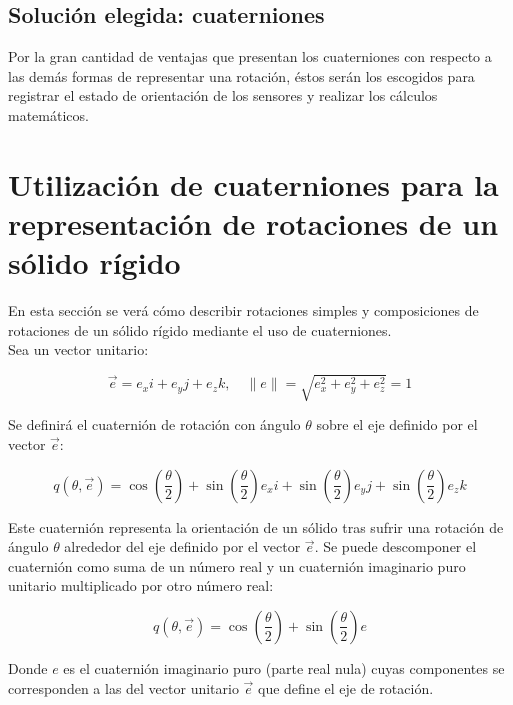 \documentclass[12pt, a4paper]{report}
\begin{document}
\subsection{Solución elegida: cuaterniones}

Por la gran cantidad de ventajas que presentan los cuaterniones con respecto a las demás formas de representar una rotación, éstos serán los escogidos para registrar el estado de orientación de los sensores y realizar los cálculos matemáticos.

\section{Utilización de cuaterniones para la representación de rotaciones de un sólido rígido}

En esta sección se verá cómo describir rotaciones simples y composiciones de rotaciones de un sólido rígido mediante el uso de cuaterniones. \\

Sea un vector unitario:

\begin{equation}
\vec{e} = e_x i + e_y j + e_z k, \quad \|e\| = \sqrt{e_x^2 + e_y^2 + e_z^2} = 1
\end{equation}


Se definirá el cuaternión de rotación con ángulo $\theta$ sobre el eje definido por el vector $\vec{e}$:

\begin{equation}
q(\theta, \vec{e}) = \cos \left(\frac{\theta}{2}\right) + \sin \left(\frac{\theta}{2}\right) e_x i + \sin \left(\frac{\theta}{2}\right) e_y j + \sin \left(\frac{\theta}{2}\right) e_z k 
\end{equation}

Este cuaternión representa la orientación de un sólido tras sufrir una rotación de ángulo $\theta$ alrededor del eje definido por el vector $\vec{e}$. Se puede descomponer el cuaternión como suma de un número real y un cuaternión imaginario puro unitario multiplicado por otro número real:

\begin{equation}
q( \theta , \vec{e}) = \cos \left(\frac{\theta}{2}\right) + \sin \left(\frac{\theta}{2}\right) e  
\end{equation}

Donde $e$ es el cuaternión imaginario puro (parte real nula) cuyas componentes se corresponden a las del vector unitario $\vec{e}$ que define el eje de rotación. \\
\end{document}
